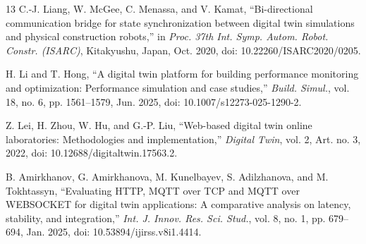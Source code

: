 \documentclass[conference]{IEEEtran}
\begin{document}
\begin{thebibliography}{13}
C.-J. Liang, W. McGee, C. Menassa, and V. Kamat, ``Bi-directional communication bridge for state synchronization between digital twin simulations and physical construction robots,'' in \emph{Proc. 37th Int. Symp. Autom. Robot. Constr. (ISARC)}, Kitakyushu, Japan, Oct. 2020, doi: 10.22260/ISARC2020/0205.

H. Li and T. Hong, ``A digital twin platform for building performance monitoring and optimization: Performance simulation and case studies,'' \emph{Build. Simul.}, vol. 18, no. 6, pp. 1561--1579, Jun. 2025, doi: 10.1007/s12273-025-1290-2.

Z. Lei, H. Zhou, W. Hu, and G.-P. Liu, ``Web-based digital twin online laboratories: Methodologies and implementation,'' \emph{Digital Twin}, vol. 2, Art. no. 3, 2022, doi: 10.12688/digitaltwin.17563.2.

B. Amirkhanov, G. Amirkhanova, M. Kunelbayev, S. Adilzhanova, and M. Tokhtassyn, ``Evaluating HTTP, MQTT over TCP and MQTT over WEBSOCKET for digital twin applications: A comparative analysis on latency, stability, and integration,'' \emph{Int. J. Innov. Res. Sci. Stud.}, vol. 8, no. 1, pp. 679--694, Jan. 2025, doi: 10.53894/ijirss.v8i1.4414.
\end{thebibliography}
\end{document}
